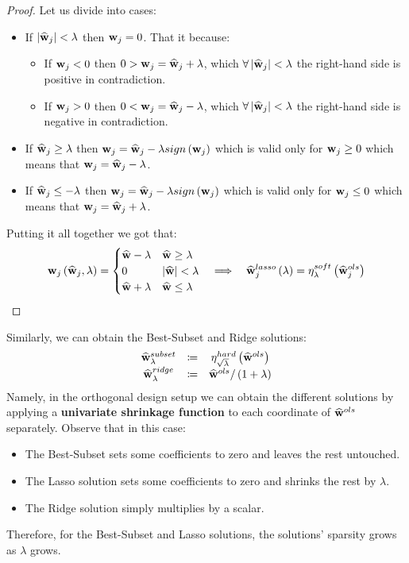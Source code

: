 \begin{proof}
	
	Let us divide into cases:
	\begin{itemize}
		\item If $\left|\widehat{\mathbf{w}}_{j}\right|<\lambda$ then $\mathbf{w}_{j}=0$. That it because:
		\begin{itemize}
			\item If $\mathbf{w}_{j}<0$ then $0>\mathbf{w}_{j}=\widehat{\mathbf{w}}_{j}+\lambda$, which $\forall\left|\widehat{\mathbf{w}}_{j}\right|<\lambda$ the right-hand side is positive in contradiction.
			\item If $\mathbf{w}_{j}>0$ then $0<\mathbf{w}_{j}=\widehat{\mathbf{w}}_{j}-\lambda$, which $\forall\left|\widehat{\mathbf{w}}_{j}\right|<\lambda$ the right-hand side is negative in contradiction.
		\end{itemize}
		\item If $\widehat{\mathbf{w}}_{j}\geq\lambda$ then $\mathbf{w}_{j}=\widehat{\mathbf{w}}_{j}-\lambda sign\left(\mathbf{w}_{j}\right)$ which is valid only for $\mathbf{w}_{j}\geq0$ which means that $\mathbf{w}_{j}=\widehat{\mathbf{w}}_{j}-\lambda$.
		\item If $\widehat{\mathbf{w}}_{j}\leq-\lambda$ then $\mathbf{w}_{j}=\widehat{\mathbf{w}}_{j}-\lambda sign\left(\mathbf{w}_{j}\right)$ which is valid only for $\mathbf{w}_{j}\leq0$ which means that $\mathbf{w}_{j}=\widehat{\mathbf{w}}_{j}+\lambda$.
	\end{itemize}
	Putting it all together we got that:
	$$
	\mathbf{w}_{j}\left(\widehat{\mathbf{w}}_{j},\lambda\right)=\begin{cases}
	\widehat{\mathbf{w}} - \lambda & \widehat{\mathbf{w}}\geq\lambda\\
	0 & \left|\widehat{\mathbf{w}}\right|<\lambda\\
	\widehat{\mathbf{w}}+\lambda & \widehat{\mathbf{w}}\leq\lambda
	\end{cases}
	\quad\Longrightarrow\quad\widehat{\mathbf{w}}_{j}^{lasso}\left(\lambda\right)=\eta^{soft}_\lambda\left(\widehat{\mathbf{w}}_{j}^{ols}\right)
	$$
\end{proof}

Similarly, we can obtain the Best-Subset and Ridge solutions:
$$
\begin{array}{ccc}
\widehat{\mathbf{w}}^{subset}_{\lambda} & \coloneqq & \eta_{\sqrt{\lambda}}^{hard}\left(\widehat{\mathbf{w}}^{ols}\right)\\
\widehat{\mathbf{w}}^{ridge}_{\lambda} & \coloneqq & \widehat{\mathbf{w}}^{ols} / \left(1+\lambda\right)
\end{array} $$
Namely, in the orthogonal design setup we can obtain the different solutions by applying a \textbf{univariate shrinkage function} to each coordinate of $\widehat{\mathbf{w}}^{ols}$ separately. Observe that in this case:
\begin{itemize}
	\item The Best-Subset sets some coefficients to zero and leaves the rest untouched.
	\item The Lasso solution sets some coefficients to zero and shrinks the rest by $\lambda$.
	\item The Ridge solution simply multiplies by a scalar.
\end{itemize}
Therefore, for the Best-Subset and Lasso solutions, the solutions' sparsity grows  as $\lambda$ grows.

